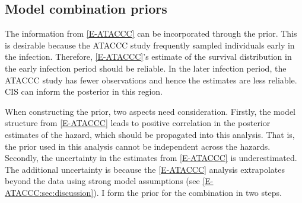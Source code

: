 \documentclass[thesis.tex]{subfiles}
\begin{document}
\subsection{Model combination priors} \label{perf-test:sec:informative-priors}

The information from \cref{E-ATACCC} can be incorporated through the prior.
This is desirable because the ATACCC study frequently sampled individuals early in the infection.
Therefore, \cref{E-ATACCC}'s estimate of the survival distribution in the early infection period should be reliable.
In the later infection period, the ATACCC study has fewer observations and hence the estimates are less reliable.
CIS can inform the posterior in this region.

When constructing the prior, two aspects need consideration.
Firstly, the model structure from \cref{E-ATACCC} leads to positive correlation in the posterior estimates of the hazard, which should be propagated into this analysis.
That is, the prior used in this analysis cannot be independent across the hazards.
Secondly, the uncertainty in the estimates from \cref{E-ATACCC} is underestimated.
The additional uncertainty is because the \cref{E-ATACCC} analysis extrapolates beyond the data using strong model assumptions (see \cref{E-ATACCC:sec:discussion}).
I form the prior for the combination in two steps.
\end{document}
